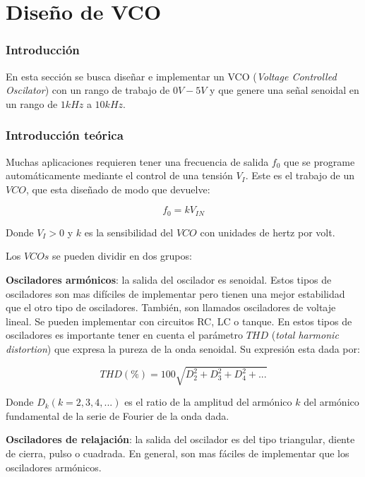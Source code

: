 \documentclass[12pt,a4paper]{article}
\begin{document}
\part{Diseño de VCO}
\section{Introducción}
En esta sección se busca diseñar e implementar un VCO (\textit{Voltage Controlled Oscilator}) con un rango de trabajo de $0V - 5V$ y que genere una señal senoidal en un rango de $1kHz$ a $10kHz$.

\section{Introducción teórica}

Muchas aplicaciones requieren tener una frecuencia de salida $f_0$ que se programe automáticamente mediante el control de una tensión $V_I$. Este es el trabajo de un $VCO$, que esta diseñado de modo que devuelve:

\begin{equation}
    f_0 = k V_{IN}
    \label{eq:f0}
\end{equation}

Donde $V_I > 0$ y $k$ es la sensibilidad del $VCO$ con unidades de hertz por volt. 



Los $VCOs$ se pueden dividir en dos grupos:


\textbf{Osciladores armónicos}: la salida del oscilador es senoidal. Estos tipos de osciladores son mas difíciles de implementar pero tienen una mejor estabilidad que el otro tipo de osciladores. También, son llamados osciladores de voltaje lineal. Se pueden implementar con circuitos RC, LC o tanque. En estos tipos de osciladores es importante tener en cuenta el parámetro $THD$ (\textit{total harmonic distortion}) que expresa la pureza de la onda senoidal. Su expresión esta dada por:
    
    \begin{displaymath}
        THD (\%) = 100 \sqrt{D^2_2 + D^2_3 + D^2_4 + ...}
    \end{displaymath}

    Donde $D_k (k=2,3,4,...)$ es el ratio de la amplitud del armónico $k$ del armónico fundamental de la serie de Fourier de la onda dada. 

    
    \textbf{Osciladores de relajación}: la salida del oscilador es del tipo triangular, diente de cierra, pulso o cuadrada. En general, son mas fáciles de implementar que los osciladores armónicos. 
    
\end{document}
